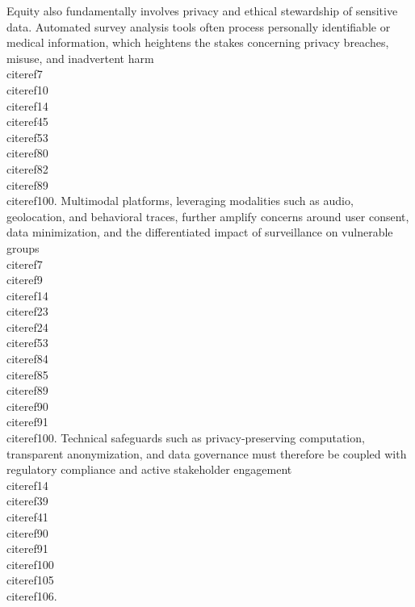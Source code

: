 \documentclass[11pt]{article}
\begin{document}
Equity also fundamentally involves privacy and ethical stewardship of sensitive data. Automated survey analysis tools often process personally identifiable or medical information, which heightens the stakes concerning privacy breaches, misuse, and inadvertent harm \\cite{ref7}\\cite{ref10}\\cite{ref14}\\cite{ref45}\\cite{ref53}\\cite{ref80}\\cite{ref82}\\cite{ref89}\\cite{ref100}. Multimodal platforms, leveraging modalities such as audio, geolocation, and behavioral traces, further amplify concerns around user consent, data minimization, and the differentiated impact of surveillance on vulnerable groups \\cite{ref7}\\cite{ref9}\\cite{ref14}\\cite{ref23}\\cite{ref24}\\cite{ref53}\\cite{ref84}\\cite{ref85}\\cite{ref89}\\cite{ref90}\\cite{ref91}\\cite{ref100}. Technical safeguards such as privacy-preserving computation, transparent anonymization, and data governance must therefore be coupled with regulatory compliance and active stakeholder engagement \\cite{ref14}\\cite{ref39}\\cite{ref41}\\cite{ref90}\\cite{ref91}\\cite{ref100}\\cite{ref105}\\cite{ref106}.
\end{document}
